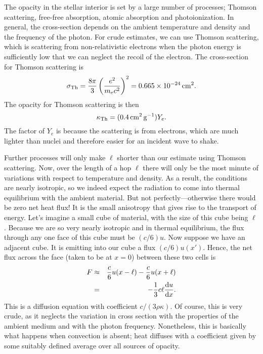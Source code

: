 The opacity in the stellar interior is set by a large number of processes; Thomson scattering, free-free absorption, atomic absorption and photoionization.  In general, the cross-section depends on the ambient temperature and density and the frequency of the photon. For crude estimates, we can use Thomson scattering, which is scattering from non-relativistic electrons when the photon energy is sufficiently low that we can neglect the recoil of the electron.  The cross-section for Thomson scattering is 
\begin{equation}\label{e.Thomson-cross-section}
\sigma_{\mathrm{Th}} = \frac{8\pi}{3}\left(\frac{e^{2}}{m_{e}c^{2}}\right)^{2} = 0.665 \times 10^{-24} \,\mathrm{c}\mathrm{m}^{2}.
\end{equation}
The opacity for Thomson scattering is then
\[ \kappa_{\mathrm{Th}} = (0.4\,\mathrm{c}\mathrm{m}^{2}\,\mathrm{g}^{-1}) Y_{e}. \]
The factor of $Y_{e}$ is because the scattering is from electrons, which are much lighter than nuclei and therefore easier for an incident wave to shake.

Further processes will only make $\ell$ shorter than our estimate using Thomson scattering.  Now, over the length of a hop $\ell$ there will only be the most minute of variations with respect to temperature and density.  As a result, the conditions are nearly isotropic, so we indeed expect the radiation to come into thermal equilibrium with the ambient material.  But not perfectly---otherwise there would be zero net heat flux!  It is the small anisotropy that gives rise to the transport of energy.  Let's imagine a small cube of material, with the size of this cube being $\ell$.  Because we are so very nearly isotropic and in thermal equilibrium, the flux through any one face of this cube must be $(c/6)u$.  Now suppose we have an adjacent cube. It is emitting into our cube a flux $(c/6) u(x')$.  Hence, the net flux across the face (taken to be at $x=0$) between these two cells is
\begin{eqnarray}
	F &\approx& \frac{c}{6} u(x-\ell) - \frac{c}{6} u (x+\ell)\nonumber \\
	&=& -\frac{1}{3}c\ell\frac{\mathrm{d} u}{\mathrm{d} x}.\label{e.rad-diffusion-simple}
\end{eqnarray}
This is a diffusion equation with coefficient $c/(3\rho\kappa)$.  Of course, this is very crude, as it neglects the variation in cross section with the properties of the ambient medium and with the photon frequency.  Nonetheless, this is basically what happens when convection is absent; heat diffuses with a coefficient given by some suitably defined average over all sources of opacity. 

